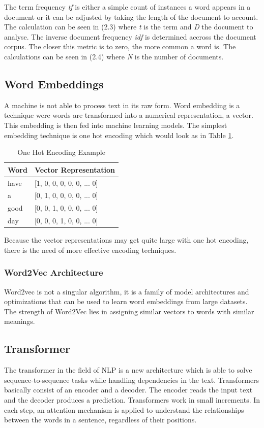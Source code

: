 The term frequency \textit{tf} is either a simple count of instances a word appears in a document or it can be adjusted by taking the length of the document to account. The calculation can be seen in (2.3) where \textit{t} is the term and \textit{D} the document to analyse. The inverse document frequency \textit{idf} is determined accross the document corpus. The closer this metric is to zero, the more common a word is. The calculations can be seen in (2.4) where \textit{N} is the number of documents.

\subsection{Word Embeddings}
A machine is not able to process text in its raw form. Word embedding is a technique were words are transformed into a numerical representation, a vector. This embedding is then fed into machine learning models. The simplest embedding technique is one hot encoding which would look as in Table \ref{tab:onehot}.

\begin{table}[H]
	\centering
	\begin{tabular}{ll}
		\hline
		\textbf{Word} & \textbf{Vector Representation} \\ \hline
		have & [1, 0, 0, 0, 0, 0, ... 0]\\ 
		a    & [0, 1, 0, 0, 0, 0, ... 0]\\ 
		good & [0, 0, 1, 0, 0, 0, ... 0]\\ 
		day  & [0, 0, 0, 1, 0, 0, ... 0]\\ \hline
	\end{tabular}
	\caption{One Hot Encoding Example}
	\label{tab:onehot}
\end{table}

Because the vector representations may get quite large with one hot encoding, there is the need of more effective encoding techniques.

\subsubsection{Word2Vec Architecture}
Word2vec is not a singular algorithm, it is a family of model architectures and optimizations that can be used to learn word embeddings from large datasets. The strength of Word2Vec lies in assigning similar vectors to words with similar meanings. 


\subsection{Transformer}
The transformer in the field of NLP is a new architecture which is able to solve sequence-to-sequence tasks while handling dependencies in the text. Transformers basically consist of an encoder and a decoder. The encoder reads the input text and the decoder produces a prediction. Transformers work in small increments. In each step, an attention mechanism is applied to understand the relationships between the words in a sentence, regardless of their positions. 


